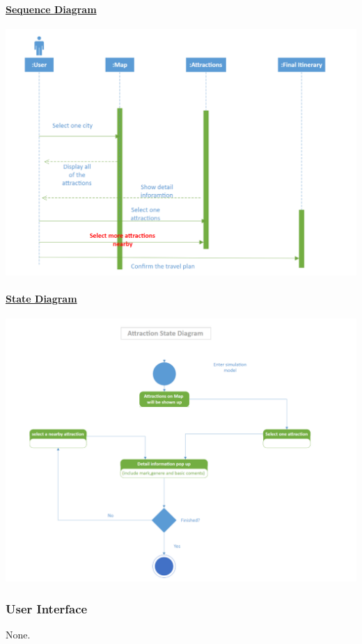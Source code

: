 \documentclass[10pt]{article}
\begin{document}
	\paragraph{\underline{Sequence Diagram}}
	\begin{center}
	
		\includegraphics[width=14cm]{8.png} 
	\end{center}

	\paragraph{\underline{State Diagram}}
	\begin{center}
	
		\includegraphics[width=14cm]{9.png} 
	\end{center}

\subsubsection{User Interface} None.
\end{document}
